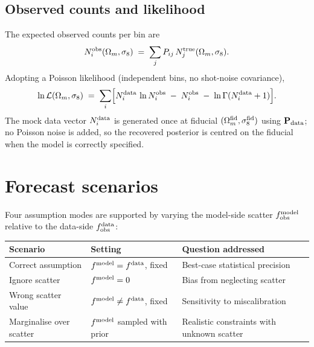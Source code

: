 \documentclass[11pt,a4paper]{article}
\begin{document}
\subsection{Observed counts and likelihood}

The expected observed counts per bin are
\begin{equation}
    N_i^{\rm obs}(\Omega_m, \sigma_8)
    \;=\; \sum_j P_{ij}\, N_j^{\rm true}(\Omega_m, \sigma_8) .
    \label{eq:Nobs}
\end{equation}
Adopting a Poisson likelihood (independent bins, no shot-noise
covariance),
\begin{equation}
    \ln \mathcal{L}(\Omega_m, \sigma_8)
    \;=\; \sum_i \Bigl[
        N_i^{\rm data}\, \ln N_i^{\rm obs}
        \;-\; N_i^{\rm obs}
        \;-\; \ln \Gamma(N_i^{\rm data} + 1)
    \Bigr] .
    \label{eq:like}
\end{equation}
The mock data vector $N_i^{\rm data}$ is generated once at fiducial
$(\Omega_m^{\rm fid}, \sigma_8^{\rm fid})$ using
$\mathbf{P}_{\rm data}$; no Poisson noise is added, so the
recovered posterior is centred on the fiducial when the model is
correctly specified.

\section{Forecast scenarios}

Four assumption modes are supported by varying the model-side
scatter $f_{\rm obs}^{\rm model}$ relative to the data-side
$f_{\rm obs}^{\rm data}$:

\begin{center}
\begin{tabular}{lll}
\toprule
Scenario                 & Setting                                                                 & Question addressed                             \\
\midrule
Correct assumption       & $f^{\rm model} = f^{\rm data}$, fixed                                   & Best-case statistical precision                \\
Ignore scatter           & $f^{\rm model} = 0$                                                     & Bias from neglecting scatter                   \\
Wrong scatter value      & $f^{\rm model} \ne f^{\rm data}$, fixed                                 & Sensitivity to miscalibration                  \\
Marginalise over scatter & $f^{\rm model}$ sampled with prior                                      & Realistic constraints with unknown scatter     \\
\bottomrule
\end{tabular}
\end{center}
\end{document}
